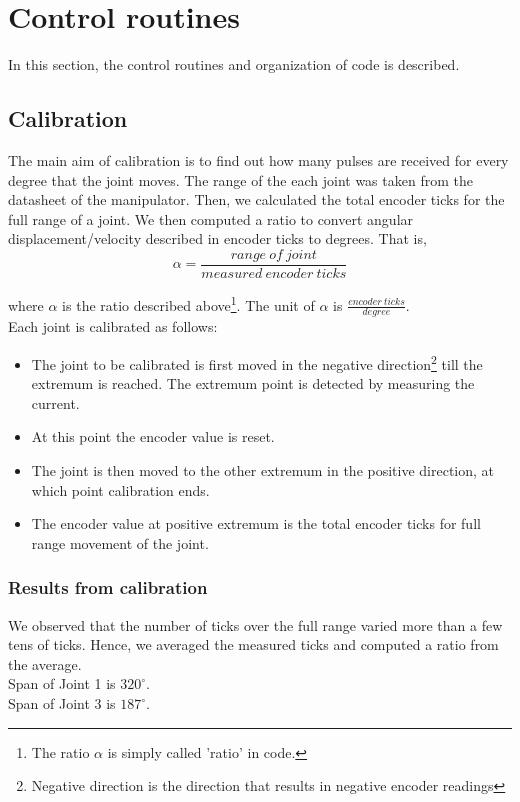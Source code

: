\documentclass[10pt,a4paper]{article}
\begin{document}
\section{Control routines}

In this section, the control routines and organization of code is
described.

\subsection{Calibration}

The main aim of calibration is to find out how many pulses are
received for every degree that the joint moves. The range of the each
joint was taken from the datasheet of the manipulator. Then, we
calculated the total encoder ticks for the full range of a joint. We
then computed a ratio to convert angular displacement/velocity
described in encoder ticks to degrees. That is,
\[ \alpha = \frac{range\ of\ joint}{measured\ encoder\ ticks}\]

where \(\alpha\) is the ratio described above\footnote{The ratio
  \(\alpha\) is simply called 'ratio' in code.}. The unit of
\(\alpha\) is \( \frac{encoder\ ticks}{degree}\). \\


Each joint is calibrated as follows:
\begin{itemize}
\item The joint to be calibrated is first moved in the negative
  direction\footnote{Negative direction is the direction that results
    in negative encoder readings} till the extremum is reached. The
  extremum point is detected by measuring the current.
\item At this point the encoder value is reset. 
\item The joint is then moved to the other extremum in the positive
  direction, at which point calibration ends.
\item The encoder value at positive extremum is the total encoder
  ticks for full range movement of the joint.
\end{itemize}

\subsubsection{Results from calibration}

We observed that the number of ticks over the full range varied more
than a few tens of ticks. Hence, we averaged the measured ticks and
computed a ratio from the average. \\ 
Span of Joint 1 is \(320^{\circ}\).\\
Span of Joint 3 is \(187^{\circ}\).\\
\end{document}
